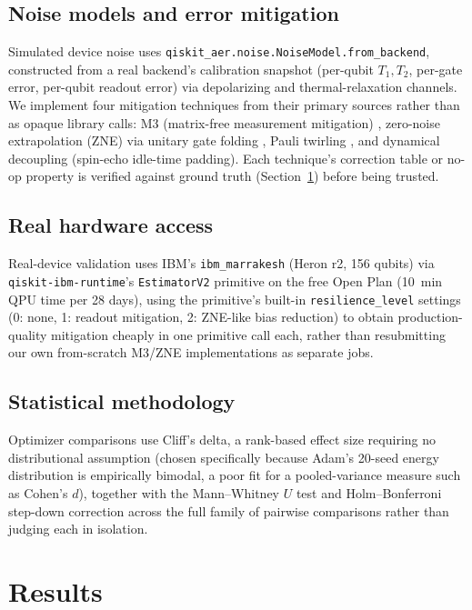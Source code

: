 \documentclass[11pt]{article}
\begin{document}
\subsection{Noise models and error mitigation}
Simulated device noise uses \texttt{qiskit\_aer.noise.NoiseModel.from\_backend},
constructed from a real backend's calibration snapshot (per-qubit $T_1,T_2$,
per-gate error, per-qubit readout error) via depolarizing and thermal-relaxation
channels. We implement four mitigation techniques from their primary sources
rather than as opaque library calls: M3 (matrix-free measurement mitigation)
\cite{nation2021m3}, zero-noise extrapolation (ZNE) via unitary gate folding
\cite{temme2017errormitigation,giurgicatiron2020digitalzne}, Pauli twirling
\cite{wallman2016noisetailoring}, and dynamical decoupling (spin-echo idle-time
padding). Each technique's correction table or no-op property is verified
against ground truth (Section~\ref{sec:results}) before being trusted.

\subsection{Real hardware access}
Real-device validation uses IBM's \texttt{ibm\_marrakesh} (Heron r2, 156
qubits) via \texttt{qiskit-ibm-runtime}'s \texttt{EstimatorV2} primitive on the
free Open Plan (\qty{10}{\minute} QPU time per 28 days), using the primitive's
built-in \texttt{resilience\_level} settings (0: none, 1: readout mitigation,
2: ZNE-like bias reduction) to obtain production-quality mitigation cheaply in
one primitive call each, rather than resubmitting our own from-scratch M3/ZNE
implementations as separate jobs.

\subsection{Statistical methodology}
Optimizer comparisons use Cliff's delta, a rank-based effect size requiring no
distributional assumption (chosen specifically because Adam's 20-seed energy
distribution is empirically bimodal, a poor fit for a pooled-variance measure
such as Cohen's $d$), together with the Mann--Whitney $U$ test and
Holm--Bonferroni step-down correction across the full family of pairwise
comparisons rather than judging each in isolation.

\section{Results}
\label{sec:results}
\end{document}
